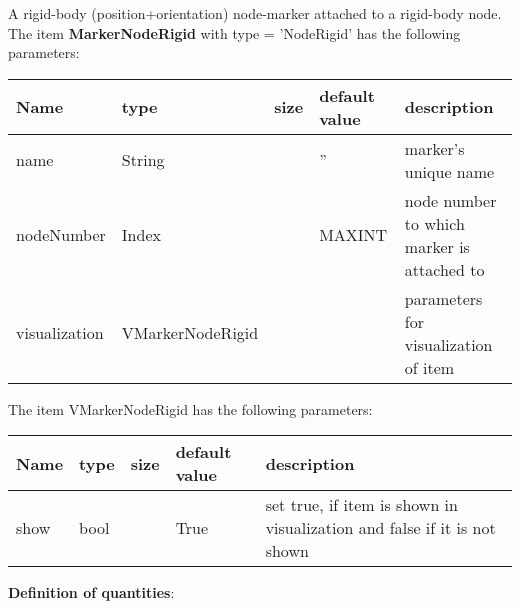 A rigid-body (position+orientation) node-marker attached to a rigid-body node.
 \\\vspace{12pt} \noindent The item {\bf MarkerNodeRigid} with type = 'NodeRigid' has the following parameters:\vspace{-1cm}\\ 
\begin{center}
  \footnotesize
  \begin{longtable}{| p{4.5cm} | p{2.5cm} | p{0.5cm} | p{2.5cm} | p{6cm} |}
    \hline
    \bf Name & \bf type & \bf size & \bf default value & \bf description \\ \hline
    name &     String &      &     '' &     marker's unique name\\ \hline
    nodeNumber &     Index &      &     MAXINT &     node number to which marker is attached to\\ \hline
    visualization & VMarkerNodeRigid & & & parameters for visualization of item \\ \hline
	  \end{longtable}
	\end{center}
The item VMarkerNodeRigid has the following parameters:\vspace{-1cm}\\ 
\begin{center}
  \footnotesize
  \begin{longtable}{| p{4.5cm} | p{2.5cm} | p{0.5cm} | p{2.5cm} | p{6cm} |}
    \hline
    \bf Name & \bf type & \bf size & \bf default value & \bf description \\ \hline
    show &     bool &      &     True &     set true, if item is shown in visualization and false if it is not shown\\ \hline
	  \end{longtable}
	\end{center}
{\bf Definition of quantities}:\\
\newpage

